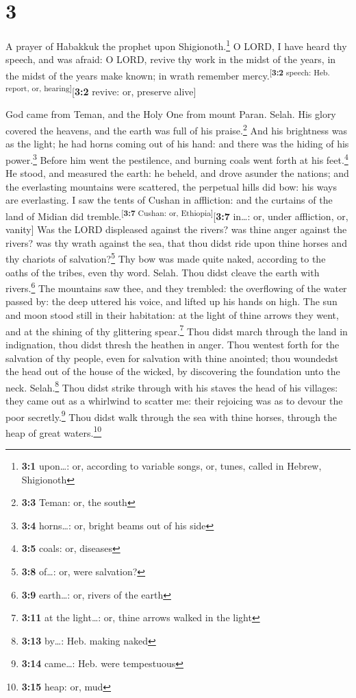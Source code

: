 \hypertarget{section-2}{%
\section{3}\label{section-2}}

 A prayer of Habakkuk the prophet upon
Shigionoth.\footnote{\textbf{3:1} upon\ldots: or, according to variable
  songs, or, tunes, called in Hebrew, Shigionoth}  O LORD,
I have heard thy speech, and was afraid: O LORD, revive thy work in the
midst of the years, in the midst of the years make known; in wrath
remember mercy.\textsuperscript{{[}\textbf{3:2} speech: Heb. report, or,
hearing{]}}{[}\textbf{3:2} revive: or, preserve alive{]}

 God came from Teman, and the Holy One from mount Paran.
Selah. His glory covered the heavens, and the earth was full of his
praise.\footnote{\textbf{3:3} Teman: or, the south}  And
his brightness was as the light; he had horns coming out of his hand:
and there was the hiding of his power.\footnote{\textbf{3:4}
  horns\ldots: or, bright beams out of his side}  Before
him went the pestilence, and burning coals went forth at his
feet.\footnote{\textbf{3:5} coals: or, diseases}  He
stood, and measured the earth: he beheld, and drove asunder the nations;
and the everlasting mountains were scattered, the perpetual hills did
bow: his ways are everlasting.  I saw the tents of Cushan
in affliction: and the curtains of the land of Midian did
tremble.\textsuperscript{{[}\textbf{3:7} Cushan: or,
Ethiopia{]}}{[}\textbf{3:7} in\ldots: or, under affliction, or,
vanity{]}  Was the LORD displeased against the rivers? was
thine anger against the rivers? was thy wrath against the sea, that thou
didst ride upon thine horses and thy chariots of salvation?\footnote{\textbf{3:8}
  of\ldots: or, were salvation?}  Thy bow was made quite
naked, according to the oaths of the tribes, even thy word. Selah. Thou
didst cleave the earth with rivers.\footnote{\textbf{3:9} earth\ldots:
  or, rivers of the earth}  The mountains saw thee, and
they trembled: the overflowing of the water passed by: the deep uttered
his voice, and lifted up his hands on high.  The sun and
moon stood still in their habitation: at the light of thine arrows they
went, and at the shining of thy glittering spear.\footnote{\textbf{3:11}
  at the light\ldots: or, thine arrows walked in the light}
 Thou didst march through the land in indignation, thou
didst thresh the heathen in anger.  Thou wentest forth
for the salvation of thy people, even for salvation with thine anointed;
thou woundedst the head out of the house of the wicked, by discovering
the foundation unto the neck. Selah.\footnote{\textbf{3:13} by\ldots:
  Heb. making naked}  Thou didst strike through with his
staves the head of his villages: they came out as a whirlwind to scatter
me: their rejoicing was as to devour the poor secretly.\footnote{\textbf{3:14}
  came\ldots: Heb. were tempestuous}  Thou didst walk
through the sea with thine horses, through the heap of great
waters.\footnote{\textbf{3:15} heap: or, mud}

